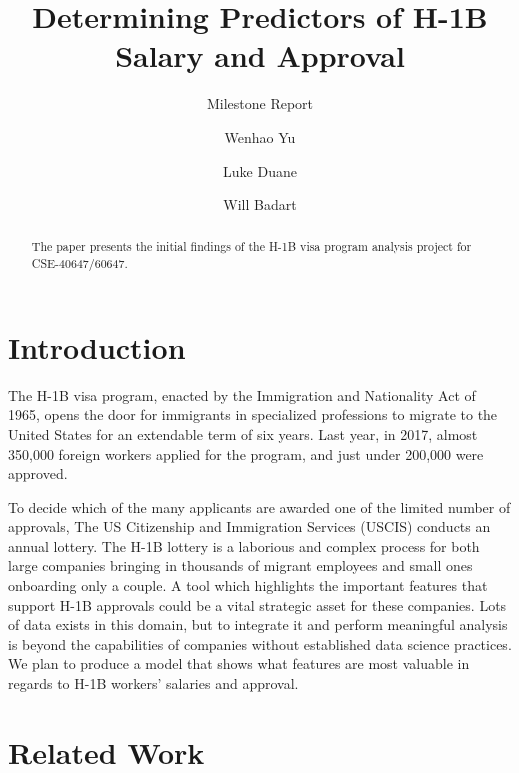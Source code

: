 \documentclass[sigconf]{acmart}
\begin{document}
\title{Determining Predictors of H-1B Salary and Approval}
\subtitle{Milestone Report}


\author{Wenhao Yu}

\author{Luke Duane}

\author{Will Badart}


\begin{abstract}
The paper presents the initial findings of the H-1B visa program analysis
project for CSE-40647/60647.
\end{abstract}

\maketitle


\section{Introduction}

The H-1B visa program, enacted by the Immigration and Nationality Act of 1965, opens the door for
immigrants in specialized professions to migrate to the United States for an extendable term of six
years. Last year, in 2017, almost 350,000 foreign workers applied for the program, and just under
200,000 were approved.

To decide which of the many applicants are awarded one of the limited number of approvals, The US
Citizenship and Immigration Services (USCIS) conducts an annual lottery.
The H-1B lottery is a laborious and complex process for both large companies bringing in
thousands of migrant employees and small ones onboarding only a couple. A tool which
highlights the important features that support H-1B approvals could be a vital strategic asset for
these companies. Lots of data exists in this domain, but to integrate it and perform meaningful
analysis is beyond the capabilities of companies without established data science practices.
We plan to produce a model that shows what features are most valuable in regards to H-1B
workers’ salaries and approval.


\section{Related Work}
\end{document}
